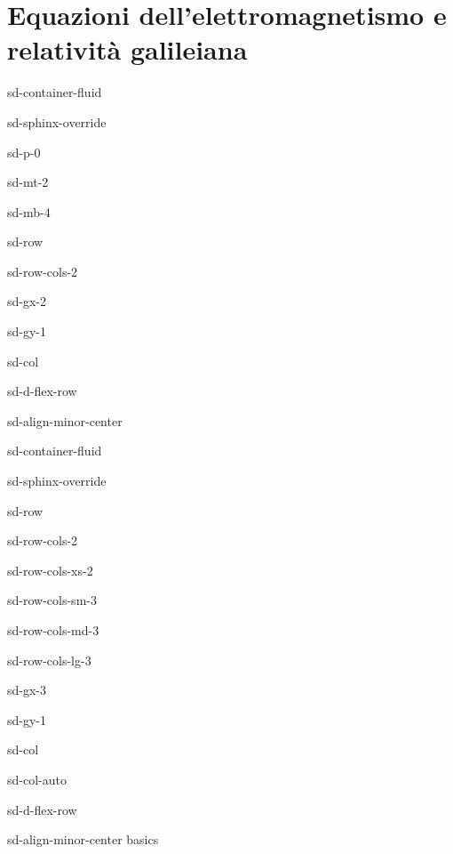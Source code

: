 \documentclass[letterpaper,10pt,italian]{jupyterBook}
\begin{document}
\chapter{Equazioni dell’elettromagnetismo e relatività galileiana}
\label{\detokenize{ch/low-speed-relativity:equazioni-dell-elettromagnetismo-e-relativita-galileiana}}\label{\detokenize{ch/low-speed-relativity:classical-electromagnetism-low-speed-relativity}}\label{\detokenize{ch/low-speed-relativity::doc}}
\sphinxstepscope

\begin{sphinxuseclass}{sd-container-fluid}
\begin{sphinxuseclass}{sd-sphinx-override}
\begin{sphinxuseclass}{sd-p-0}
\begin{sphinxuseclass}{sd-mt-2}
\begin{sphinxuseclass}{sd-mb-4}
\begin{sphinxuseclass}{sd-row}
\begin{sphinxuseclass}{sd-row-cols-2}
\begin{sphinxuseclass}{sd-gx-2}
\begin{sphinxuseclass}{sd-gy-1}
\begin{sphinxuseclass}{sd-col}
\begin{sphinxuseclass}{sd-d-flex-row}
\begin{sphinxuseclass}{sd-align-minor-center}
\begin{sphinxuseclass}{sd-container-fluid}
\begin{sphinxuseclass}{sd-sphinx-override}
\begin{sphinxuseclass}{sd-row}
\begin{sphinxuseclass}{sd-row-cols-2}
\begin{sphinxuseclass}{sd-row-cols-xs-2}
\begin{sphinxuseclass}{sd-row-cols-sm-3}
\begin{sphinxuseclass}{sd-row-cols-md-3}
\begin{sphinxuseclass}{sd-row-cols-lg-3}
\begin{sphinxuseclass}{sd-gx-3}
\begin{sphinxuseclass}{sd-gy-1}
\begin{sphinxuseclass}{sd-col}
\begin{sphinxuseclass}{sd-col-auto}
\begin{sphinxuseclass}{sd-d-flex-row}
\begin{sphinxuseclass}{sd-align-minor-center}
\sphinxAtStartPar
basics


\end{sphinxuseclass}
\end{sphinxuseclass}
\end{sphinxuseclass}
\end{sphinxuseclass}
\end{sphinxuseclass}
\end{sphinxuseclass}
\end{sphinxuseclass}
\end{sphinxuseclass}
\end{sphinxuseclass}
\end{sphinxuseclass}
\end{sphinxuseclass}
\end{sphinxuseclass}
\end{sphinxuseclass}
\end{sphinxuseclass}
\end{sphinxuseclass}
\end{sphinxuseclass}
\end{sphinxuseclass}
\end{sphinxuseclass}
\end{sphinxuseclass}
\end{sphinxuseclass}
\end{sphinxuseclass}
\end{sphinxuseclass}
\end{sphinxuseclass}
\end{sphinxuseclass}
\end{sphinxuseclass}
\end{sphinxuseclass}
\end{document}

